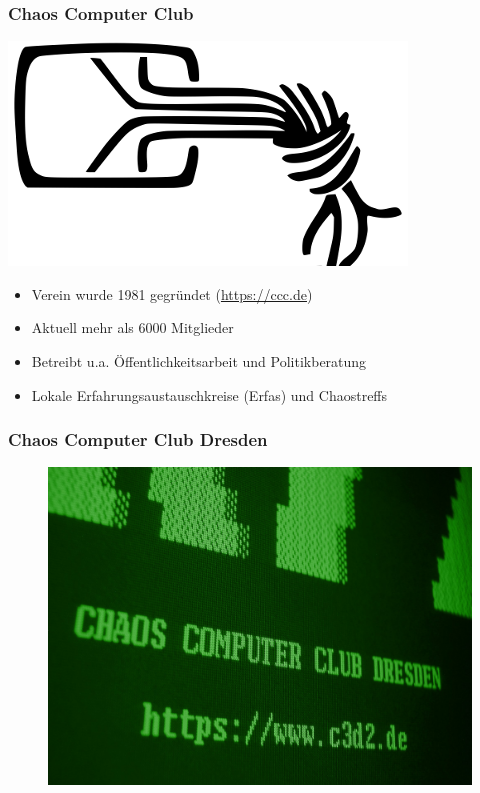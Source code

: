 \documentclass[12pt]{beamer}
\begin{document}
\begin{frame}
	\frametitle{Chaos Computer Club}
	\begin{center}
		\includegraphics[height=0.2\textheight]{img/chaosknoten.png}
	\end{center}	
	\begin{itemize}
		\item<1-> Verein wurde 1981 gegründet (\url{https://ccc.de})          
		\item<2-> Aktuell mehr als 6000 Mitglieder
		\item<3-> Betreibt u.a. Öffentlichkeitsarbeit und Politikberatung      
		\item<4-> Lokale Erfahrungsaustauschkreise (Erfas) und Chaostreffs
	\end{itemize}
\end{frame}

\begin{frame}
	\frametitle{Chaos Computer Club Dresden}
	\begin{figure}
		\includegraphics[height=0.7\textheight]{img/c3d2_green.jpg}
    \end{figure}
\end{frame}
\end{document}
